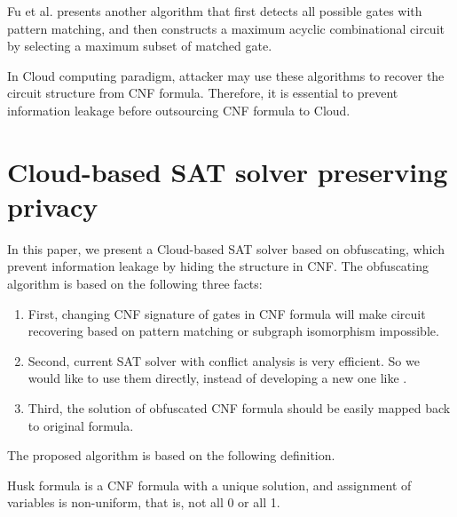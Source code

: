 \documentclass[runningheads,a4paper]{llncs}
\begin{document}
Fu et al.\cite{t9} presents another algorithm that 
first detects all possible gates with pattern matching,
and then constructs a maximum acyclic combinational circuit by selecting a maximum subset of matched gate.

In Cloud computing paradigm,
attacker may use these algorithms to recover the circuit structure from CNF formula.
Therefore, 
it is essential to prevent information leakage before outsourcing CNF formula to Cloud.

\section{Cloud-based SAT solver preserving privacy}\label{algo}

In this paper, we present a Cloud-based SAT solver based on obfuscating, 
which prevent information leakage by hiding the structure in CNF.
The obfuscating algorithm is based on the following three facts:
\begin{enumerate}
 \item First, 
 changing CNF signature of gates in CNF formula will make circuit recovering 
 based on pattern matching or subgraph isomorphism impossible.
 \item Second, 
 current SAT solver with conflict analysis \cite{t10} is very efficient.
So we would like to use them directly,
instead of developing a new one like \cite{t11}.
 \item Third,
 the solution of obfuscated CNF formula should be easily mapped back to original formula.
\end{enumerate}

The proposed algorithm is based on the following definition.

\begin{definition}
Husk formula is a CNF formula with a unique solution,
and assignment of variables is non-uniform,
that is,
not all 0 or all 1.
\end{definition}
\end{document}
